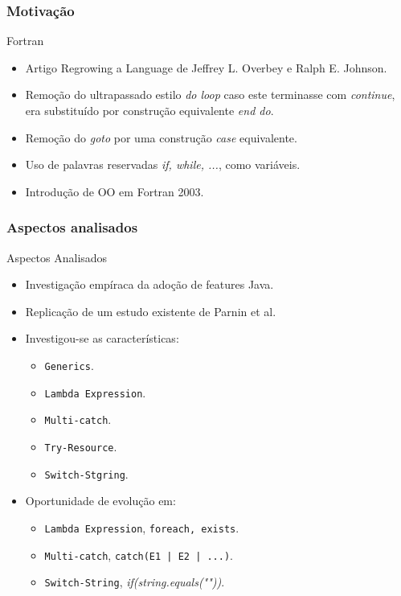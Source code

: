 \documentclass[]{beamer}
\begin{document}
	\begin{frame}[label=Motivação]
		\frametitle{Motivação}
		\begin{block}{Fortran}
			\begin{itemize}
				\item Artigo Regrowing a Language de Jeffrey L. Overbey e Ralph E. Johnson.
				
				\item Remoção do ultrapassado estilo \textit{do loop} caso este terminasse com \textit{continue}, era substituído por construção equivalente \textit{end do}.
				
				\item Remoção do \textit{goto} por uma construção \textit{case} equivalente.
				
				\item Uso de palavras reservadas \textit{if, while, ...}, como variáveis.
				
				\item Introdução de OO em Fortran 2003.
			\end{itemize}
		\end{block}
	\end{frame}
	
	\begin{frame}[label=AspectosAnalisados]
		\frametitle{Aspectos analisados}
		\begin{block}{Aspectos Analisados}
			\begin{itemize}
				\item Investigação empíraca da adoção de features Java.
				
				\item Replicação de um estudo existente de Parnin et al.
				
				\item Investigou-se as características:
					\begin{itemize}
						\item \texttt{Generics}.
						\item \texttt{Lambda Expression}.
						\item \texttt{Multi-catch}.
						\item \texttt{Try-Resource}.
						\item \texttt{Switch-Stgring}.
					\end{itemize}

				\item Oportunidade de evolução em:
					\begin{itemize}
						\item \texttt{Lambda Expression}, \texttt{foreach, exists}.
						\item \texttt{Multi-catch}, \texttt{catch(E1 | E2 | ...)}.
						\item \texttt{Switch-String}, \textit{if(string.equals(""))}.
					\end{itemize}

			\end{itemize}
		\end{block}
	\end{frame}
	
\end{document}
